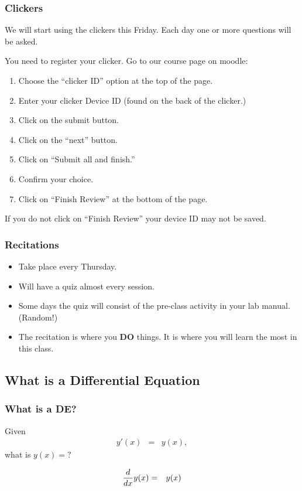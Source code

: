 \begin{frame}
  \frametitle{Clickers}

  We will start using the clickers this Friday. Each day one or more
  questions will be asked.

  You need to register your clicker. Go to our course page on moodle:
  \begin{enumerate}
  \item Choose the ``clicker ID'' option at the top of the page.
  \item Enter your clicker Device ID (found on the back of the
    clicker.)
  \item Click on the submit button.
  \item Click on the ``next'' button.
  \item Click on ``Submit all and finish.''
  \item Confirm your choice.
  \item Click on ``Finish Review'' at the bottom of the page.
  \end{enumerate}

  If you do not click on ``Finish Review'' your device ID may not be saved.
   
  
\end{frame}


\begin{frame}
  \frametitle{Recitations}

  \begin{itemize}
  \item Take place every Thursday.
  \item Will have a quiz almost every session.
  \item Some days the quiz will consist of the pre-class activity in
    your lab manual. (Random!)
  \item The recitation is where you \textbf{DO} things. It is where
    you will learn the most in this class.
  \end{itemize}
\end{frame}

\subsection{What is a Differential Equation}


\begin{frame}
  \frametitle{What is a DE?}

  Given
  \begin{eqnarray*}
    y'(x) & = & y(x),
  \end{eqnarray*}
  what is $y(x)=?$

  \begin{eqnarray*}
    \deriv{y(x)}{x} & = & y(x)
  \end{eqnarray*}

\end{frame}


